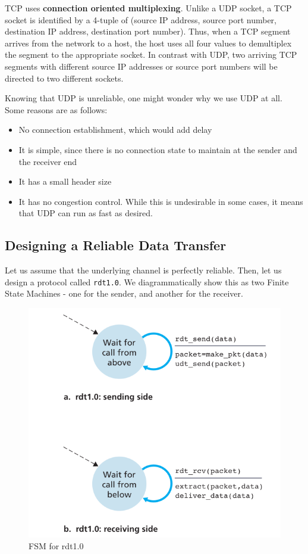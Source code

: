 \documentclass[12pt,letterpaper]{article}
\theoremstyle{definition}
\begin{document}
TCP uses \textbf{connection oriented multiplexing}. Unlike a UDP socket, a TCP socket is identified by a 4-tuple of (source IP address, source port number, destination IP address, destination port number). Thus, when a TCP segment arrives from the network to a host, the host uses all four values to demultiplex the segment to the appropriate socket. In contrast with UDP, two arriving TCP segments with different source IP addresses or source port numbers will be directed to two different sockets.

Knowing that UDP is unreliable, one might wonder why we use UDP at all. Some reasons are as follows:
\begin{itemize}
  \item No connection establishment, which would add delay
  \item It is simple, since there is no connection state to maintain at the sender and the receiver end
  \item It has a small header size
  \item It has no congestion control. While this is undesirable in some cases, it means that UDP can run as fast as desired.
\end{itemize}

\subsection{Designing a Reliable Data Transfer}

Let us assume that the underlying channel is perfectly reliable. Then, let us design a protocol called \texttt{rdt1.0}. We diagrammatically show this as two Finite State Machines - one for the sender, and another for the receiver.

\begin{figure}[htpb]
  \centering
  \includegraphics[width=0.8\linewidth]{./assets/rdt1_fsm.png}
  \caption{FSM for rdt1.0}%
  \label{fig:}
\end{figure}
\end{document}
